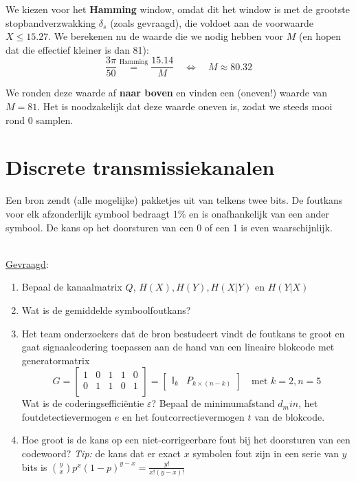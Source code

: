 \documentclass[kulak]{kulakarticle}
\begin{document}
	We kiezen voor het \textbf{Hamming} window, omdat dit het window is met de grootste stopbandverzwakking \(\delta_s\) (zoals gevraagd), die voldoet aan de voorwaarde \(X \leq 15.27\). We berekenen nu de waarde die we nodig hebben voor \(M\) (en hopen dat die effectief kleiner is dan 81):
	\begin{equation*}
		\frac{3\pi}{50} \overset{\text{Hamming}}{=} \frac{15.14}{M} \quad \Leftrightarrow \quad M \approx 80.32
	\end{equation*}

	We ronden deze waarde af \textbf{naar boven} en vinden een (oneven!) waarde van \(M=\boxed{81}\). Het is noodzakelijk dat deze waarde oneven is, zodat we steeds mooi rond 0 samplen.


	\newpage \section{Discrete transmissiekanalen}

	Een bron zendt (alle mogelijke) pakketjes uit van telkens twee bits. De foutkans voor elk afzonderlijk symbool bedraagt 1\% en is onafhankelijk van een ander symbool. De kans op het doorsturen van een 0 of een 1 is even waarschijnlijk.

	\hfill \\
	\underline{Gevraagd}:
	\begin{enumerate}
		\item Bepaal de kanaalmatrix \(Q\), \(H(X), H(Y), H(X|Y)\) en \(H(Y|X)\)
		\item Wat is de gemiddelde symboolfoutkans?
		\item Het team onderzoekers dat de bron bestudeert vindt de foutkans te groot en gaat signaalcodering toepassen aan de hand van een lineaire blokcode met generatormatrix \[
		G=\begin{bmatrix}
		1 & 0 & 1 & 1 & 0 \\
		0 & 1 & 1 & 0 & 1 \\
		\end{bmatrix}=\begin{bmatrix}
		\mathbb{I}_{k} & P_{k\times (n-k)}
	\end{bmatrix} \quad \text{met } k=2, n=5\]Wat is de coderingsefficiëntie \(\varepsilon\)? Bepaal de minimumafstand \(d_min\), het foutdetectievermogen \(e\) en het foutcorrectievermogen \(t\) van de blokcode.
		\item Hoe groot is de kans op een niet-corrigeerbare fout bij het doorsturen van een codewoord? \textit{Tip:} de kans dat er exact \(x\) symbolen fout zijn in een serie van \(y\) bits is \(\binom{y}{x}p^x(1-p)^{y-x}=\frac{y!}{x!(y-x)!}\)
	\end{enumerate}
\end{document}
